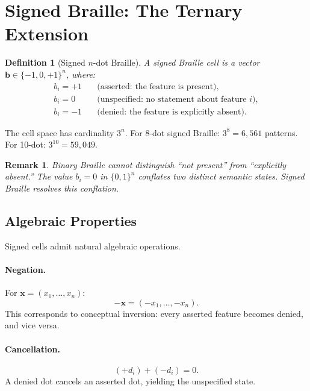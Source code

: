 \documentclass[11pt,a4paper]{article}
\newtheorem{definition}{Definition}
\newtheorem{remark}{Remark}
\newcommand{\bvec}{\bm{b}}
\newcommand{\xvec}{\bm{x}}
\begin{document}
\section{Signed Braille: The Ternary Extension}
\label{sec:signed}

\begin{definition}[Signed $n$-dot Braille]
  A signed Braille cell is a vector
  $\bvec \in \{-1, 0, +1\}^n$,
  where:
  \begin{align}
    b_i = +1 &\quad \text{(asserted: the feature is present)}, \\
    b_i = 0  &\quad \text{(unspecified: no statement about feature $i$)}, \\
    b_i = -1 &\quad \text{(denied: the feature is explicitly absent)}.
  \end{align}
\end{definition}

The cell space has cardinality $3^n$.
For 8-dot signed Braille: $3^8 = 6{,}561$ patterns.
For 10-dot: $3^{10} = 59{,}049$.

\begin{remark}
  Binary Braille cannot distinguish ``not present'' from
  ``explicitly absent.''
  The value $b_i = 0$ in $\{0,1\}^n$ conflates two distinct semantic states.
  Signed Braille resolves this conflation.
\end{remark}

\subsection{Algebraic Properties}

Signed cells admit natural algebraic operations.

\paragraph{Negation.}
For $\xvec = (x_1, \ldots, x_n)$:
\begin{equation}
  -\xvec = (-x_1, \ldots, -x_n).
\end{equation}
This corresponds to conceptual inversion: every asserted feature
becomes denied, and vice versa.

\paragraph{Cancellation.}
\begin{equation}
  (+d_i) + (-d_i) = 0.
\end{equation}
A denied dot cancels an asserted dot, yielding the unspecified state.
\end{document}
